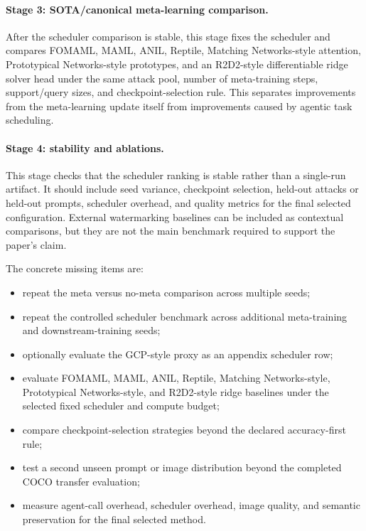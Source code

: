 \paragraph{Stage 3: SOTA/canonical meta-learning comparison.}
After the scheduler comparison is stable, this stage fixes the scheduler and compares FOMAML, MAML, ANIL, Reptile, Matching Networks-style attention, Prototypical Networks-style prototypes, and an R2D2-style differentiable ridge solver head under the same attack pool, number of meta-training steps, support/query sizes, and checkpoint-selection rule.
This separates improvements from the meta-learning update itself from improvements caused by agentic task scheduling.

\paragraph{Stage 4: stability and ablations.}
This stage checks that the scheduler ranking is stable rather than a single-run artifact.
It should include seed variance, checkpoint selection, held-out attacks or held-out prompts, scheduler overhead, and quality metrics for the final selected configuration.
External watermarking baselines can be included as contextual comparisons, but they are not the main benchmark required to support the paper's claim.

The concrete missing items are:
\begin{itemize}
    \item repeat the meta versus no-meta comparison across multiple seeds;
    \item repeat the controlled scheduler benchmark across additional meta-training and downstream-training seeds;
    \item optionally evaluate the GCP-style proxy as an appendix scheduler row;
    \item evaluate FOMAML, MAML, ANIL, Reptile, Matching Networks-style, Prototypical Networks-style, and R2D2-style ridge baselines under the selected fixed scheduler and compute budget;
    \item compare checkpoint-selection strategies beyond the declared accuracy-first rule;
    \item test a second unseen prompt or image distribution beyond the completed COCO transfer evaluation;
    \item measure agent-call overhead, scheduler overhead, image quality, and semantic preservation for the final selected method.
\end{itemize}
